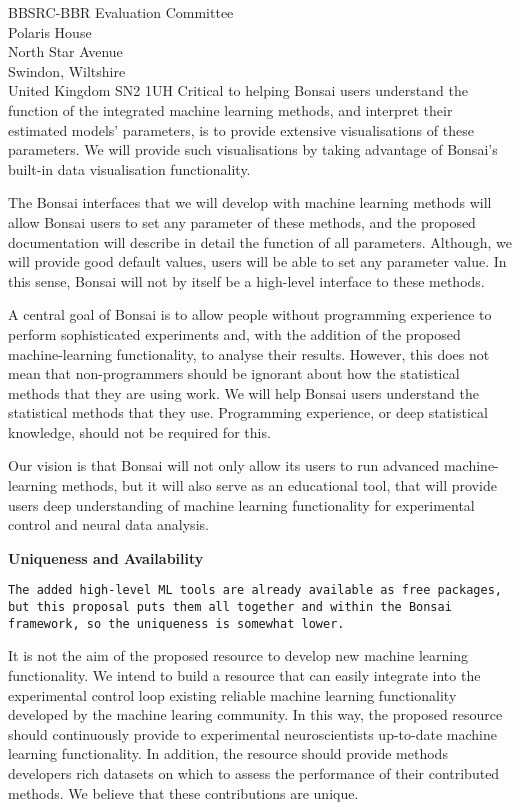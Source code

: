 \documentclass[12pt]{letter}
\begin{document}
\begin{letter}{
    BBSRC-BBR Evaluation Committee\\
    Polaris House\\
    North Star Avenue\\
    Swindon, Wiltshire\\
    United Kingdom SN2 1UH
}
Critical to helping Bonsai users understand the function of the integrated machine
learning methods, and interpret their estimated models' parameters, is to
provide extensive visualisations of these parameters. We will provide such
visualisations by taking advantage of Bonsai's built-in data visualisation functionality.

The Bonsai interfaces that we will develop with machine learning methods will
allow Bonsai users to set any parameter of these methods, and the proposed
documentation will describe in detail the function of all parameters. Although,
we will provide good default values, users will be able to set any parameter
value. In this sense, Bonsai will not by itself be a high-level interface to these
methods.

A central goal of Bonsai is to allow people without programming experience to
perform sophisticated experiments and, with the addition of the proposed
machine-learning functionality, to analyse their results. However, this does
not mean that non-programmers should be ignorant about how the statistical
methods that they are using work. We will help Bonsai users understand the
statistical methods that they use. Programming experience, or deep statistical
knowledge, should not be required for this.

Our vision is that Bonsai will not only allow its users to run advanced
machine-learning methods, but it will also serve as an educational tool, that
will provide users deep understanding of machine learning functionality for
experimental control and neural data analysis.

\noindent\textbf{Uniqueness and Availability}

\texttt{The added high-level ML tools are already available as free packages,
but this proposal puts them all together and within the Bonsai framework, so
the uniqueness is somewhat lower.}

It is not the aim of the proposed resource to develop new machine learning
functionality. We intend to build a resource that can easily integrate into the
experimental control loop existing reliable machine learning functionality
developed by the machine learing community. In this way, the
proposed resource should continuously provide to experimental neuroscientists
up-to-date machine learning functionality. In addition, the resource should
provide methods developers rich datasets on which to assess the performance of
their contributed methods. We believe that these contributions are unique.


\end{letter}
\end{document}
